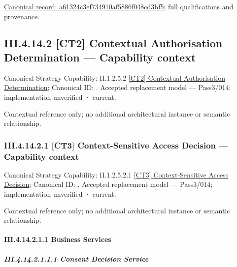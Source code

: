 {\footnotesize \href{../../../../../../../../continuum/business/business-function/a61324c3ef734910af5886f048cd3bf5.md}{Canonical record: a61324c3ef734910af5886f048cd3bf5}; full qualifications and provenance.}\par
\subsection*{III.4.14.2 [CT2] Contextual Authorisation Determination — Capability context}
\label{navigation:III.4.14.2}

{\small Canonical Strategy Capability: II.1.2.5.2 \hyperref[element:c8bd1d6e0796442a934a74cc69077543]{[CT2] Contextual Authorisation Determination}; Canonical ID: \texttt{}. Accepted replacement model — Pass3/014; implementation unverified · current.}\par
Contextual reference only; no additional architectural instance or semantic relationship.\par
\subsubsection*{III.4.14.2.1 [CT3] Context-Sensitive Access Decision — Capability context}
\label{navigation:III.4.14.2.1}

{\small Canonical Strategy Capability: II.1.2.5.2.1 \hyperref[element:8719d8ed49f940cfbba2d26ae14ea54d]{[CT3] Context-Sensitive Access Decision}; Canonical ID: \texttt{}. Accepted replacement model — Pass3/014; implementation unverified · current.}\par
Contextual reference only; no additional architectural instance or semantic relationship.\par
\paragraph*{III.4.14.2.1.1 Business Services}
\label{navigation:III.4.14.2.1.1}

\subparagraph*{III.4.14.2.1.1.1 Consent Decision Service}
\label{navigation:III.4.14.2.1.1.1}

